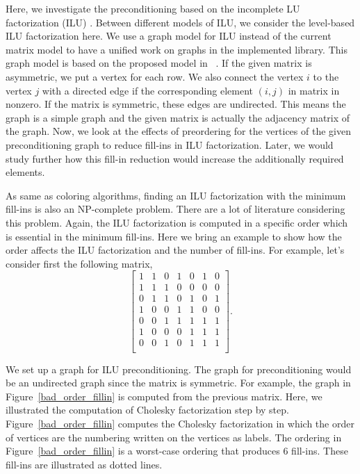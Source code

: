 \documentclass[12pt, twoside]{book}
\begin{document}
Here, we investigate the preconditioning based on the incomplete LU factorization (ILU) \cite{ilu2003}.
Between different models of ILU, we consider the level-based ILU factorization here.
We use a graph model for ILU instead of the current matrix model to have a unified
work on graphs in the implemented library. This graph model is based on the proposed
model in ~\cite{precond-pothen}. If the given matrix is asymmetric,
we put a vertex for each row. We also connect the vertex $i$ to the
vertex $j$ with a directed edge if the corresponding element $(i,j)$ in matrix
in nonzero. If the matrix is symmetric, these edges are undirected. This means
the graph is a simple graph and the given matrix is actually the adjacency
matrix of the graph.
Now, we look at the effects of preordering for the vertices of the given preconditioning graph to reduce fill-ins in ILU factorization. Later, we would study further how this fill-in reduction would increase the additionally required elements.

As same as coloring algorithms, finding an ILU factorization with the minimum
fill-ins is also an NP-complete problem. There are a lot of literature
considering this problem\cite{ilu_ordering1,ilu_ordering2,ilu_ordering3,ilu_ordering4}.
Again, the ILU factorization is computed in a specific order which is essential
in the minimum fill-ins. Here we bring an example to show how the order affects
the ILU factorization and the number of fill-ins.
For example, let's consider first the following matrix,
$$\begin{bmatrix}
1 & 1 & 0 & 1 & 0 & 1 & 0\\
1 & 1 & 1 & 0 & 0 & 0 & 0\\
0 & 1 & 1 & 0 & 1 & 0 & 1\\
1 & 0 & 0 & 1 & 1 & 0 & 0\\
0 & 0 & 1 & 1 & 1 & 1 & 1\\
1 & 0 & 0 & 0 & 1 & 1 & 1\\
0 & 0 & 1 & 0 & 1 & 1 & 1\\
\end{bmatrix}.$$

We set up a graph for ILU preconditioning.
The graph for preconditioning would be an undirected graph
since the matrix is symmetric.
For example, the graph in Figure~\ref{bad_order_fillin}
is computed from the previous matrix. Here, we illustrated the
computation of Cholesky factorization step by step.
Figure~\ref{bad_order_fillin} computes the Cholesky factorization
in which the order of vertices are the numbering written on the vertices
as labels. The ordering in Figure~\ref{bad_order_fillin} is a worst-case ordering that produces $6$ fill-ins. These fill-ins are illustrated as dotted lines.
\end{document}

